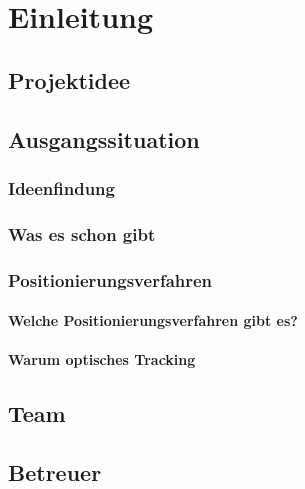 \chapter{Einleitung}
\renewcommand{\kapitelautor}{}

\section{Projektidee}

\section{Ausgangssituation}

  \subsection{Ideenfindung}

  \subsection{Was es schon gibt}

  \subsection{Positionierungsverfahren}

    \subsubsection{Welche Positionierungsverfahren gibt es?}

    \subsubsection{Warum optisches Tracking}

\section{Team}

\section{Betreuer}

